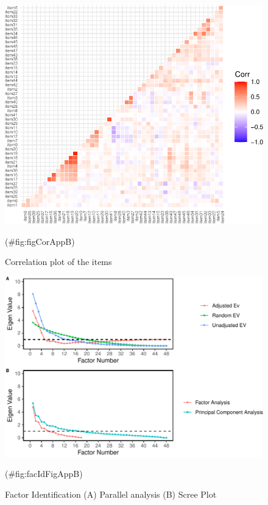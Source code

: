 \begin{appendix}
\begin{figure}

{\centering \includegraphics[width=1\linewidth]{manuscript_files/figure-latex/figCorAppB-1} 

}

\caption{Correlation plot of the items}(\#fig:figCorAppB)
\end{figure}

\begin{figure}

{\centering \includegraphics{manuscript_files/figure-latex/facIdFigAppB-1} 

}

\caption{Factor Identification (A) Parallel analysis (B) Scree Plot}(\#fig:facIdFigAppB)
\end{figure}


\end{appendix}

